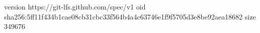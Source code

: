 version https://git-lfs.github.com/spec/v1
oid sha256:5ff11f434b1cae08cb31cbc33f564b4a4c63746e1f9f5705d3e8be92aea18682
size 349676
